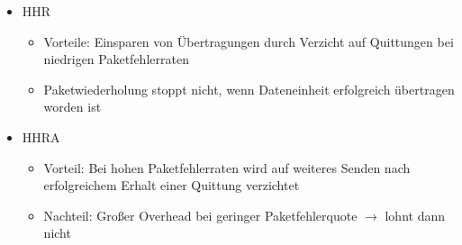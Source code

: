 \begin{itemize}
\begin{itemize}
\begin{itemize}
			\item HHR
			\begin{itemize}
				\item Vorteile: Einsparen von Übertragungen durch Verzicht auf Quittungen bei niedrigen Paketfehlerraten
				\item Paketwiederholung stoppt nicht, wenn Dateneinheit erfolgreich übertragen worden ist
			\end{itemize}
			\item HHRA
			\begin{itemize}
				\item Vorteil: Bei hohen Paketfehlerraten wird auf weiteres Senden nach erfolgreichem Erhalt einer Quittung verzichtet
				\item Nachteil: Großer Overhead bei geringer Paketfehlerquote \(\rightarrow\) lohnt dann nicht
			\end{itemize}
		\end{itemize}
	\end{itemize}
\end{itemize}

